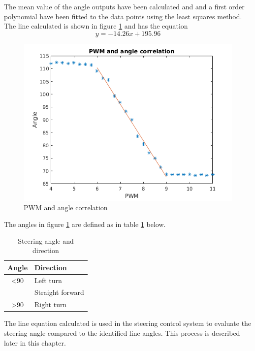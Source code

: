 The mean value of the angle outputs have been calculated and and a first order polynomial have been fitted to the data points using the least squares method. The line calculated is shown in figure  \ref{fig:PWM and angle correlation} and has the equation $$ y=-14.26x + 195.96$$ 

\begin{figure}[H]
  \includegraphics[width=\textwidth]{./img/PWMPLOT_2.png}
  \centering
  \caption{PWM and angle correlation}
  \label{fig:PWM and angle correlation}
\end{figure}

The angles in figure \ref{fig:PWM and angle correlation} are defined as in table \ref{Steering angle and direction} below.

\begin{table}[H]
\centering
\caption{Steering angle and direction}
\label{Steering angle and direction}
\begin{tabular}{@{} cl @{}}
\toprule
Angle		& Direction \\ 
\midrule
 \textless 90		& Left turn \\ 
  \: 90		& Straight forward \\ 
 \textgreater 90		& Right turn \\ 
\bottomrule
 \end{tabular}
\end{table}


The line equation calculated is used in the steering control system to evaluate the steering angle compared to the identified line angles. This process is described later in this chapter.\\


